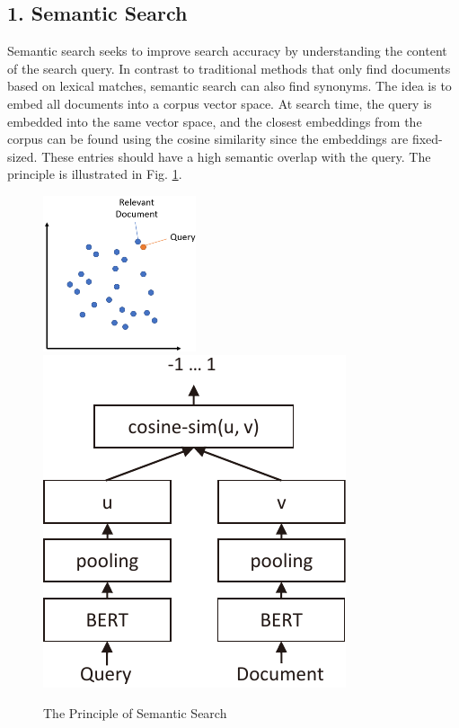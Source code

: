 \documentclass[11pt]{article}
\begin{document}
\hypertarget{1-semantic-search}{%
\subsection{1. Semantic Search}\label{1-semantic-search}}

Semantic search seeks to improve search accuracy by understanding the
content of the search query. In contrast to traditional methods that
only find documents based on lexical matches, semantic search can also
find synonyms. The idea is to embed all documents into a corpus vector
space. At search time, the query is embedded into the same vector space,
and the closest embeddings from the corpus can be found using the cosine
similarity since the embeddings are fixed-sized. These entries should
have a high semantic overlap with the query. The principle is
illustrated in Fig. \ref{semantic search principle}.

\begin{figure}
\centering
\includegraphics[width=0.4\textwidth]{readme.assets/SemanticSearch.png}
\includegraphics{readme.assets/bi-encoder.pdf}
\caption{The Principle of Semantic Search \cite{c7}}
\label{semantic search principle}
\end{figure}
\end{document}
